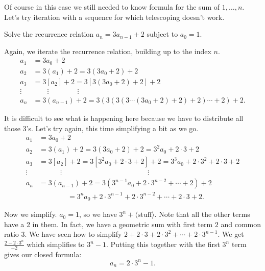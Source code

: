 \documentclass[11pt,]{book}
\theoremstyle{ptxplainnotitle}
\theoremstyle{ptxplaintitle}
\theoremstyle{ptxdefinitionnotitle}
\theoremstyle{ptxdefinitiontitle}
\theoremstyle{ptxdefinitionnotitle}
\theoremstyle{ptxdefinitiontitle}
\theoremstyle{ptxdefinitionnotitle}
\theoremstyle{ptxdefinitiontitle}
\theoremstyle{ptxdefinitiontitlenonumber}
\theoremstyle{ptxdefinitiontitlenonumber}
\numberwithin{equation}{chapter}
\newcommand{\amp}{&}
\begin{document}
\hypertarget{p-448}{}%
Of course in this case we still needed to know formula for the sum of \(1,\ldots,n\). Let's try iteration with a sequence for which telescoping doesn't work.%
\begin{example}\label{example-22}
\hypertarget{p-449}{}%
Solve the recurrence relation \(a_n = 3a_{n-1} + 2\) subject to \(a_0 = 1\).%
\par\smallskip%
\noindent\textbf{}\hypertarget{solution-68}{}\hypertarget{p-450}{}%
Again, we iterate the recurrence relation, building up to the index \(n\).%
\begin{align*}
a_1 \amp = 3a_0 + 2\\
a_2 \amp = 3(a_1) + 2 = 3(3a_0 + 2) + 2\\
a_3 \amp = 3[a_2] + 2 = 3[3(3a_0 + 2) + 2] + 2\\
\vdots \amp \qquad \vdots \qquad \qquad \vdots\\
a_n \amp = 3(a_{n-1}) + 2 = 3(3(3(3\cdots(3a_0 + 2) + 2) + 2)\cdots + 2)+ 2.
\end{align*}
%
\par
\hypertarget{p-451}{}%
It is difficult to see what is happening here because we have to distribute all those 3's. Let's try again, this time simplifying a bit as we go.%
\begin{align*}
a_1 \amp = 3a_0 + 2\\
a_2 \amp = 3(a_1) + 2 = 3(3a_0 + 2) + 2 = 3^2a_0 + 2\cdot 3 + 2\\
a_3 \amp = 3[a_2] + 2 = 3[3^2a_0 + 2\cdot 3 + 2] + 2 = 3^3 a_0 + 2 \cdot 3^2 + 2 \cdot 3 + 2\\
\vdots \amp \qquad\quad \vdots \hspace{2in} \vdots\\
a_n \amp = 3(a_{n-1}) + 2 = 3(3^{n-1}a_0 + 2 \cdot 3^{n-2} + \cdots +2)+ 2\\
\amp \qquad \qquad = 3^n a_0 + 2\cdot 3^{n-1} + 2 \cdot 3^{n-2} + \cdots + 2\cdot 3 + 2.
\end{align*}
%
\par
\hypertarget{p-452}{}%
Now we simplify. \(a_0 = 1\), so we have \(3^n + \langle\text{stuff}\rangle\). Note that all the other terms have a 2 in them. In fact, we have a geometric sum with first term \(2\) and common ratio \(3\). We have seen how to simplify \(2 + 2\cdot 3 + 2 \cdot 3^2 + \cdots + 2\cdot 3^{n-1}\). We get \(\frac{2-2\cdot 3^n}{-2}\) which simplifies to \(3^n - 1\). Putting this together with the first \(3^n\) term gives our closed formula:%
\begin{equation*}
a_n = 2\cdot 3^n - 1.
\end{equation*}
%
\end{example}
\end{document}
